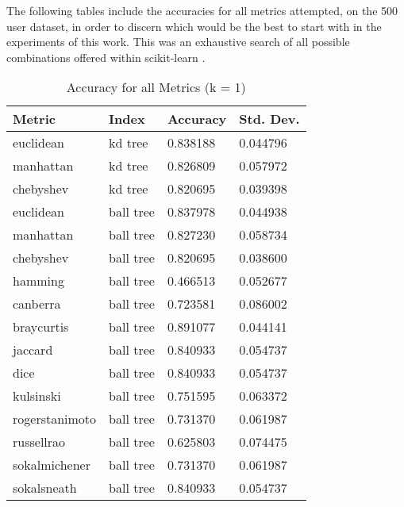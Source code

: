 
%

The following tables include the accuracies for all metrics attempted, on the 500 user dataset, in order to discern which would be the best to start with in the experiments of this work. This was an exhaustive search of all possible combinations offered within scikit-learn \cite{scikit-learn}.


\begin{table}
  \centering
  \caption{Accuracy for all Metrics (k = 1)}
  \begin{tabular}{|l|l|l|l|}
    \hline
    {\bf Metric} & {\bf Index} & {\bf Accuracy} & {\bf Std. Dev.} \\\hline
    euclidean & kd tree & 0.838188 & 0.044796 \\\hline
    manhattan & kd tree & 0.826809 & 0.057972 \\\hline
    chebyshev & kd tree & 0.820695 & 0.039398 \\\hline
    euclidean & ball tree & 0.837978 & 0.044938 \\\hline
    manhattan & ball tree & 0.827230 & 0.058734 \\\hline
    chebyshev & ball tree & 0.820695 & 0.038600 \\\hline
    hamming & ball tree & 0.466513 & 0.052677 \\\hline
    canberra & ball tree & 0.723581 & 0.086002 \\\hline
    braycurtis & ball tree & 0.891077 & 0.044141 \\\hline
    jaccard & ball tree & 0.840933 & 0.054737 \\\hline
    dice & ball tree & 0.840933 & 0.054737 \\\hline
    kulsinski & ball tree & 0.751595 & 0.063372 \\\hline
    rogerstanimoto & ball tree & 0.731370 & 0.061987 \\\hline
    russellrao & ball tree & 0.625803 & 0.074475 \\\hline
    sokalmichener & ball tree & 0.731370 & 0.061987 \\\hline
    sokalsneath & ball tree & 0.840933 & 0.054737 \\\hline

\end{tabular}
\end{table}
